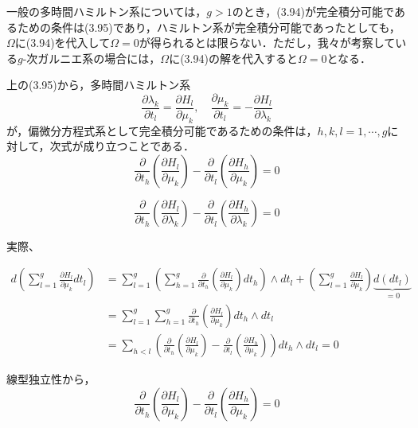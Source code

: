 \documentclass[paper=a4, fontsize=11pt]{jlreq} %
\newenvironment{story}{%
  \begin{mdframed}[
    backgroundcolor=red!5, %
    linewidth=0pt,         %
    innertopmargin=10pt,   %
    innerbottommargin=10pt,
    innerrightmargin=10pt, %
    innerleftmargin=10pt
  ]%
}{%
  \end{mdframed}%
}
\theoremstyle{break}
\theoremstyle{qa}
\begin{document}
\begin{story}
一般の多時間ハミルトン系については，$g>1$のとき，(3.94)が完全積分可能であるための条件は(3.95)であり，ハミルトン系が完全積分可能であったとしても，$\Omega$に(3.94)を代入して$\Omega=0$が得られるとは限らない．ただし，我々が考察している$g$-次ガルニエ系の場合には，$\Omega$に(3.94)の解を代入すると$\Omega=0$となる．

上の(3.95)から，多時間ハミルトン系
\begin{equation}
    \frac{\partial \lambda_k}{\partial t_l} = \frac{\partial H_l}{\partial \mu_k}, \quad \frac{\partial \mu_k}{\partial t_l} = - \frac{\partial H_l}{\partial \lambda_k} \tag{3.96}
\end{equation}
が，偏微分方程式系として完全積分可能であるための条件は，$h, k, l=1, \cdots, g$に対して，次式が成り立つことである．
\begin{equation}
    \frac{\partial}{\partial t_h} \left( \frac{\partial H_l}{\partial \mu_k} \right) - \frac{\partial}{\partial t_l} \left( \frac{\partial H_h}{\partial \mu_k} \right) = 0 \tag{3.97}
\end{equation}

\begin{equation}
    \frac{\partial}{\partial t_h} \left( \frac{\partial H_l}{\partial \lambda_k} \right) - \frac{\partial}{\partial t_l} \left( \frac{\partial H_h}{\partial \lambda_k} \right) = 0 \tag{3.98}
\end{equation}

\end{story}
実際、

\begin{align*}
    d \left( \sum_{l=1}^g \frac{\partial H_l}{\partial \mu_k} dt_l \right) &= \sum_{l=1}^g \left( \sum_{h=1}^g \frac{\partial}{\partial t_h} \left( \frac{\partial H_l}{\partial \mu_k} \right) dt_h \right) \wedge dt_l + \left( \sum_{l=1}^g \frac{\partial H_l}{\partial \mu_k} \right) \underbrace{d(dt_l)}_{=0} \\
    &= \sum_{l=1}^g \sum_{h=1}^g \frac{\partial}{\partial t_h} \left( \frac{\partial H_l}{\partial \mu_k} \right) dt_h \wedge dt_l \\
    &= \sum_{h < l} \left( \frac{\partial}{\partial t_h} \left( \frac{\partial H_l}{\partial \mu_k} \right) - \frac{\partial}{\partial t_l} \left( \frac{\partial H_h}{\partial \mu_k} \right) \right) dt_h \wedge dt_l = 0
\end{align*}

\vspace{1em}
\noindent
線型独立性から，
\begin{equation*}
    \frac{\partial}{\partial t_h} \left( \frac{\partial H_l}{\partial \mu_k} \right) - \frac{\partial}{\partial t_l} \left( \frac{\partial H_h}{\partial \mu_k} \right) = 0
\end{equation*}
\end{document}
